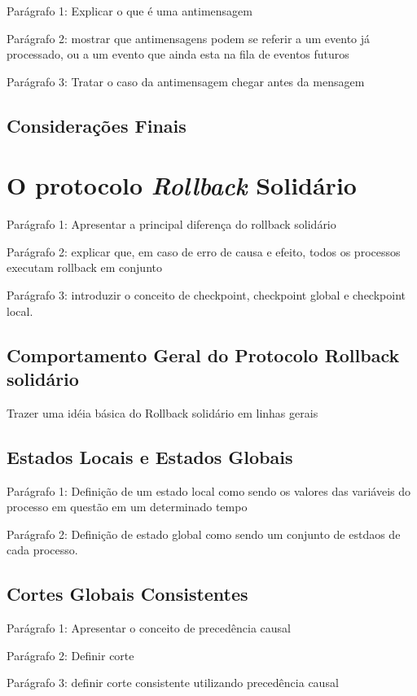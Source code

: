 Parágrafo 1: Explicar o que é uma antimensagem

Parágrafo 2: mostrar que antimensagens podem se referir a um evento já processado, ou a um evento que ainda esta na fila de eventos futuros

Parágrafo 3: Tratar o caso da antimensagem chegar antes da mensagem

\subsection{Considerações Finais}


\section{O protocolo \textit{Rollback} Solidário}

Parágrafo 1: Apresentar a principal diferença do rollback solidário

Parágrafo 2: explicar que, em caso de erro de causa e efeito, todos os processos executam rollback em conjunto

Parágrafo 3: introduzir o conceito de checkpoint, checkpoint global e checkpoint local.

\subsection{Comportamento Geral do Protocolo Rollback solidário}

Trazer uma idéia básica do Rollback solidário em linhas gerais

\subsection{Estados Locais e Estados Globais}

Parágrafo 1: Definição de um estado local como sendo os valores das variáveis do processo em questão em um determinado tempo

Parágrafo 2: Definição de estado global como sendo um conjunto de estdaos de cada processo.

\subsection{Cortes Globais Consistentes}

Parágrafo 1: Apresentar o conceito de precedência causal

Parágrafo 2: Definir corte 

Parágrafo 3: definir corte consistente utilizando precedência causal

